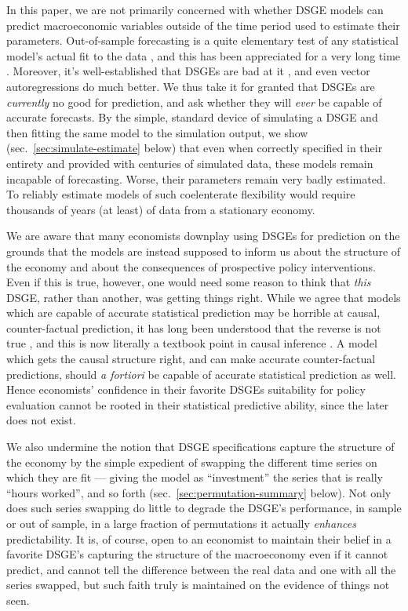 \documentclass[11pt]{article}
\begin{document}
In this paper, we are not primarily concerned with whether DSGE models
can predict macroeconomic variables outside of the time period used to
estimate their parameters. Out-of-sample forecasting is a quite
elementary test of any statistical model's actual fit to the data
\citep{tEoSL-2nd}, and this has been appreciated for a very long time
\citep{Stone1974,Geisser-predictive-sample-reuse,Geisser-Eddy-predictive-approach}.
Moreover, it's well-established that DSGEs are bad at it
\citep{Edge-Gurkaynak-on-dsges}, and even vector autoregressions do much
better. We thus take it for granted that DSGEs are \emph{currently} no
good for prediction, and ask whether they will \emph{ever} be capable of
accurate forecasts. By the simple, standard device of simulating a DSGE
and then fitting the same model to the simulation output, we show
(sec.~\ref{sec:simulate-estimate} below) that even when correctly
specified in their entirety and provided with centuries of simulated
data, these models remain incapable of forecasting. Worse, their
parameters remain very badly estimated. To reliably estimate models of
such coelenterate flexibility would require thousands of years (at
least) of data from a stationary economy.

We are aware that many economists downplay using DSGEs for prediction on
the grounds that the models are instead supposed to inform us about the
structure of the economy and about the consequences of prospective
policy interventions. Even if this is true, however, one would need some
reason to think that \emph{this} DSGE, rather than another, was getting
things right. While we agree that models which are capable of accurate
statistical prediction may be horrible at causal, counter-factual
prediction, it has long been understood that the reverse is not true
\citep{Spirtes-Glymour-Scheines-1st, Pearl-causality}, and this is now
literally a textbook point in causal inference
\citep{Morgan-Winship-counterfactuals-2nd}. A model which gets the
causal structure right, and can make accurate counter-factual
predictions, should \emph{a fortiori} be capable of accurate statistical
prediction as well. Hence economists' confidence in their favorite DSGEs
suitability for policy evaluation cannot be rooted in their statistical
predictive ability, since the later does not exist.

We also undermine the notion that DSGE specifications capture the
structure of the economy by the simple expedient of swapping the
different time series on which they are fit --- giving the model as
``investment'' the series that is really ``hours worked'', and so forth
(sec.~\ref{sec:permutation-summary} below). Not only does such series
swapping do little to degrade the DSGE's performance, in sample or out
of sample, in a large fraction of permutations it actually
\emph{enhances} predictability. It is, of course, open to an economist
to maintain their belief in a favorite DSGE's capturing the structure of
the macroeconomy even if it cannot predict, and cannot tell the
difference between the real data and one with all the series swapped,
but such faith truly is maintained on the evidence of things not seen.
\end{document}
